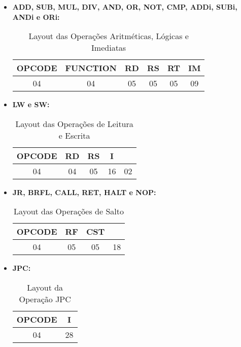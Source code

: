 \documentclass{report}
\begin{document}
  \begin{itemize}
     
     \item \textbf{ADD, SUB, MUL, DIV, AND, OR, NOT, CMP, ADDi, SUBi, ANDi e ORi:}

  \begin{table}[H]
\centering
	\begin{tabular}{|c|c|c|c|c|c|}
  	\hline 
  	\textbf{OPCODE} & \textbf{FUNCTION} & \textbf{RD} & \textbf{RS} & \textbf{RT} & \textbf{IM} \\ 
  	\hline 
  	04 & 04 & 05 & 05 & 05 & 09 \\ 
  	\hline 
  	\end{tabular} 
  	\caption{Layout das Operações Aritméticas, Lógicas e Imediatas}
  \end{table}
  
   \item \textbf{LW e SW:}

  \begin{table}[H]
\centering
	\begin{tabular}{|c|c|c|c|c|}
  	\hline 
  	\textbf{OPCODE} & \textbf{RD} & \textbf{RS} & \textbf{I} & \textbf{} \\ 
  	\hline 
  	04 & 04 & 05 & 16 & 02 \\ 
  	\hline 
  	\end{tabular} 
  	\caption{Layout das Operações de Leitura e Escrita}
  \end{table}
  
  \item \textbf{JR, BRFL, CALL, RET, HALT e NOP:}

  \begin{table}[H]
\centering
	\begin{tabular}{|c|c|c|c|}
  	\hline 
  	\textbf{OPCODE} & \textbf{RF} & \textbf{CST} & \textbf{} \\ 
  	\hline 
  	04 & 05 & 05 & 18 \\ 
  	\hline 
  	\end{tabular} 
  	\caption{Layout das Operações de Salto}
  \end{table}
  
    \item \textbf{JPC:}

  \begin{table}[H]
\centering
	\begin{tabular}{|c|c|}
  	\hline 
  	\textbf{OPCODE} & \textbf{I} \\ 
  	\hline 
  	04 & 28 \\ 
  	\hline 
  	\end{tabular} 
  	\caption{Layout da Operação JPC}
  \end{table}
  
  \end{itemize}
\end{document}
